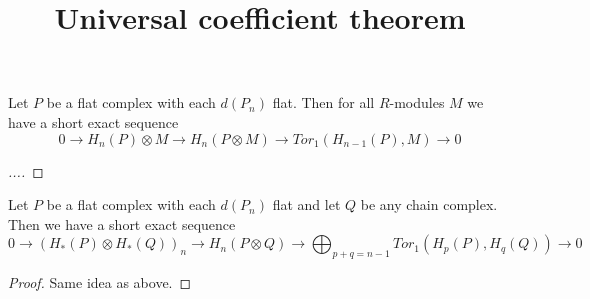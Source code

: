 \documentclass{ximera}
\title{Universal coefficient theorem}
\begin{document}
\begin{abstract}
  
\end{abstract}
\maketitle

\begin{theorem}
  Let $P$ be a flat complex with each $d(P_n)$ flat.  Then for all
  $R$-modules $M$ we have a short exact sequence
  \[
  0 \rightarrow H_n(P) \otimes M 
  \rightarrow H_n(P \otimes M)
  \rightarrow Tor_1(H_{n-1}(P), M) \rightarrow 0
  \]
\end{theorem}
\begin{proof}
  [...]
\end{proof}

\begin{theorem}
  Let $P$ be a flat complex with each $d(P_n)$ flat and let $Q$ be any
  chain complex.  Then we have a short exact sequence
  \[
  0 \rightarrow (H_*(P) \otimes H_*(Q))_n 
  \rightarrow H_n(P \otimes Q)
  \rightarrow \bigoplus_{p+q = n-1}Tor_1(H_{p}(P), H_q(Q)) \rightarrow 0
  \]
\end{theorem}
\begin{proof}
  Same idea as above.
\end{proof}
\end{document}
